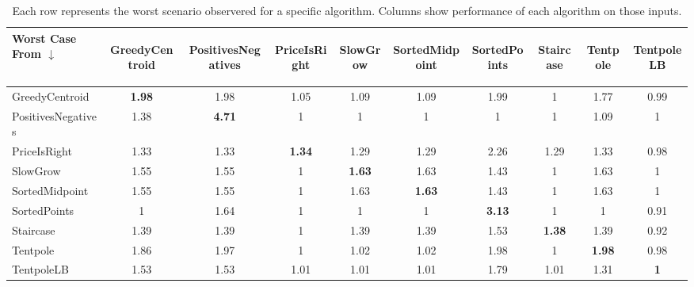 \begin{table*} \centering
\begin{tabular}{|l|cccccccc|c|}
\hline
Worst Case From $\downarrow$
 & \begin{sideways} GreedyCentroid \end{sideways}
 & \begin{sideways} PositivesNegatives \end{sideways}
 & \begin{sideways} PriceIsRight \end{sideways}
 & \begin{sideways} SlowGrow \end{sideways}
 & \begin{sideways} SortedMidpoint \end{sideways}
 & \begin{sideways} SortedPoints \end{sideways}
 & \begin{sideways} Staircase \end{sideways}
 & \begin{sideways} Tentpole \end{sideways}
 & \begin{sideways} TentpoleLB \end{sideways}
 \\ \hline
GreedyCentroid & \textbf{1.98} & 1.98 & 1.05 & 1.09 & 1.09 & 1.99 & 1 & 1.77 & 0.99\\ 
PositivesNegatives & 1.38 & \textbf{4.71} & 1 & 1 & 1 & 1 & 1 & 1.09 & 1\\ 
PriceIsRight & 1.33 & 1.33 & \textbf{1.34} & 1.29 & 1.29 & 2.26 & 1.29 & 1.33 & 0.98\\ 
SlowGrow & 1.55 & 1.55 & 1 & \textbf{1.63} & 1.63 & 1.43 & 1 & 1.63 & 1\\ 
SortedMidpoint & 1.55 & 1.55 & 1 & 1.63 & \textbf{1.63} & 1.43 & 1 & 1.63 & 1\\ 
SortedPoints & 1 & 1.64 & 1 & 1 & 1 & \textbf{3.13} & 1 & 1 & 0.91 \\ 
Staircase & 1.39 & 1.39 & 1 & 1.39 & 1.39 & 1.53 & \textbf{1.38} & 1.39 & 0.92\\ 
Tentpole & 1.86 & 1.97 & 1 & 1.02 & 1.02 & 1.98 & 1 &  \textbf{1.98} &0.98\\ \hline
TentpoleLB & 1.53 & 1.53 & 1.01 & 1.01 & 1.01 & 1.79 & 1.01 & 1.31 & \textbf{1}\\ 
\hline 
 \end{tabular}
  \caption{Each row represents the worst scenario observered for a specific algorithm.  Columns show performance of each algorithm on those inputs.}
  \label{table:worstCases}
\end{table*}


